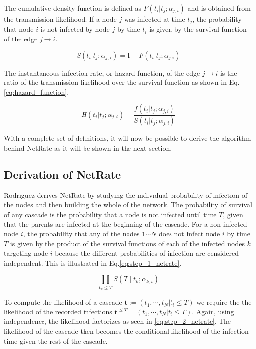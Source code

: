 The cumulative density function is defined as $F(t_{i}|t_{j};\alpha _{j,i})$ and is obtained from the transmission likelihood. If a node $j$ was infected at time $t_{j}$, the probability that node $i$ is not infected by node $j$ by time $t_{i}$ is given by the survival function of the edge $j\rightarrow i$:

\begin{equation}\label{eq:survival_function}
S(t_{i}|t_{j};\alpha _{j,i})=1-F(t_{i}|t_{j};\alpha _{j,i})
\end{equation}

The instantaneous infection rate, or hazard function, of the edge $j\rightarrow i$ is the ratio of the transmission likelihood over the survival function as shown in Eq.\ref{eq:hazard_function}.

\begin{equation}\label{eq:hazard_function}
H(t_{i}|t_{j};\alpha _{j,i})=\frac{f(t_{i}|t_{j};\alpha _{j,i})}{S(t_{i}|t_{j};\alpha _{j,i})}
\end{equation}

With a complete set of definitions, it will now be possible to derive the algorithm behind NetRate as it will be shown in the next section.

\subsection{Derivation of NetRate}

Rodriguez \cite{rodriguez2011uncovering} derives NetRate by studying the individual probability of infection of the nodes and then building the whole of the network. The probability of survival of any cascade is the probability that a node is not infected until time $T$, given that the parents are infected at the beginning of the cascade. For a non-infected node $i$, the probability that any of the nodes $1\cdots N$ does not infect node $i$ by time $T$ is given by the product of the survival functions of each of the infected nodes $k$ targeting node $i$ because the different probabilities of infection are considered independent. This is illustrated in Eq.\ref{eq:step_1_netrate}.

\begin{equation}\label{eq:step_1_netrate}
\prod_{t_{k}\leq T}S(T\mid t_{k};\alpha _{k,i})
\end{equation}

To compute the likelihood of a cascade $\textbf{t}:=(t_{1},\cdots,t_{N}|t_{i}\leq T)$ we require the the likelihood of the recorded infections $\textbf{t}^{\leq T}=(t_{1},\cdots,t_{N}|t_{i}\leq T)$. Again, using independence, the likelihood factorizes as seen in \ref{eq:step_2_netrate}. The likelihood of the cascade then becomes the conditional likelihood of the infection time given the rest of the cascade.


